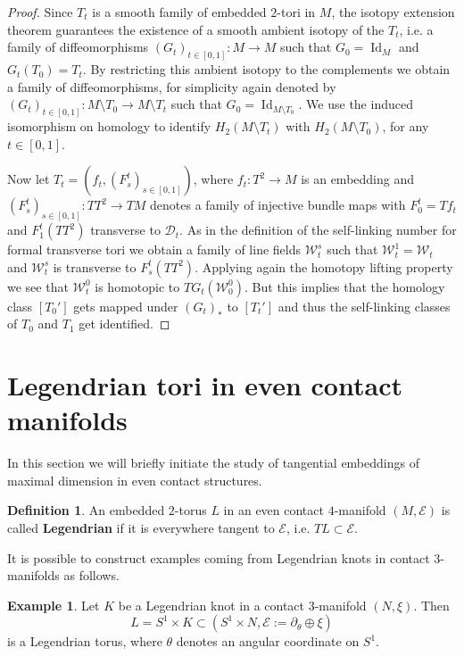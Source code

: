\documentclass{amsart} %
\newcommand{\D}{\mathcal{D}}
\newcommand{\E}{\mathcal{E}}
\newcommand{\W}{\mathcal{W}}
\theoremstyle{thm}
\theoremstyle{definition}
\newtheorem{defi}[Theorem]{Definition}
\newtheorem{ex}[Theorem]{Example}
\begin{document}
\begin{proof}
Since $T_t$ is a smooth family of embedded $2$-tori in $M$, the isotopy extension theorem guarantees the existence of a smooth ambient isotopy of the $T_t$, i.e. a family of diffeomorphisms $(G_t)_{t\in[0,1]}\colon M \rightarrow M$ such that $G_0=\operatorname{Id}_M$ and $G_t(T_0)=T_t$. By restricting this ambient isotopy to the complements we obtain a family of diffeomorphisms, for simplicity again denoted by $(G_t)_{t\in[0,1]}\colon M\setminus T_0\rightarrow M\setminus T_t$ such that $G_0=\operatorname{Id}_{M\setminus T_0}$. We use the induced isomorphism on homology to identify $H_2(M\setminus T_t)$ with $H_2(M\setminus T_0)$, for any $t\in[0,1]$.  

Now let $T_t=(f_t,(F_s^t)_{s\in[0,1]})$, where $f_t\colon T^2\rightarrow M$ is an embedding and $(F_s^t)_{s\in[0,1]}\colon TT^2\rightarrow TM$ denotes a family of injective bundle maps with $F_0^t=Tf_t$ and $F_1^t(TT^2)$ transverse to $\D_t$. As in the definition of the self-linking number for formal transverse tori we obtain a family of line fields $\W_t^s$ such that $\W_t^1=\W_t$ and $\W_t^s$ is transverse to $F_s^t(TT^2)$. Applying again the homotopy lifting property we see that $\W_t^0$ is homotopic to $TG_t(\W_0^0)$. But this implies that the homology class $[T_0']$ gets mapped under $(G_t)_*$ to $[T_t']$ and thus the self-linking classes of $T_0$ and $T_1$ get identified.
\end{proof}


\section{Legendrian tori in even contact manifolds}
\label{section:EvenLegendrian} 

In this section we will briefly initiate the study of tangential embeddings of maximal dimension in even contact structures. 

\begin{defi}
An embedded $2$-torus $L$ in an even contact $4$-manifold $(M,\E)$ is called \textbf{Legendrian} if it is everywhere tangent to $\E$, i.e. $TL\subset\E$.
\end{defi}

It is possible to construct examples coming from Legendrian knots in contact $3$-manifolds as follows.

\begin{ex}
Let $K$ be a Legendrian knot in a contact $3$-manifold $(N,\xi)$. Then 
$$L=S^1\times K\subset (S^1\times N,\E:=\partial_\theta\oplus\xi)$$
is a Legendrian torus, where $\theta$ denotes an angular coordinate on $S^1$.
\end{ex}
\end{document}
